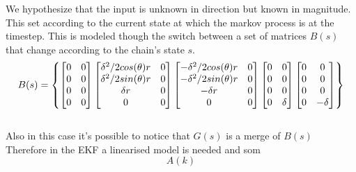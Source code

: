 \documentclass[twocolumn]{article}
\begin{document}
    We hypothesize that the input is unknown in direction but known in magnitude. This set according to the current state at which the markov process is at the timestep.
    This is modeled though the switch between a set of matrices $B(s)$ that change according to the chain's state $s$.
    \begin{equation*}%
        \resizebox{.99 \columnwidth}{!}{
        $B(s)=\begin{Bmatrix}
            \begin{bmatrix}
                0 & 0 \\
                0          & 0 \\
                0     & 0 \\
                0          & 0 \\
            \end{bmatrix}
            \begin{bmatrix}
                \delta^2/2 cos(\theta)r & 0 \\
                \delta^2/2 sin(\theta)r & 0 \\
                \delta r    & 0 \\
                0          & 0 \\
            \end{bmatrix}
            \begin{bmatrix}
                -\delta^2/2 cos(\theta)r & 0 \\
                -\delta^2/2 sin(\theta)r & 0 \\
                -\delta r    & 0 \\
                0          & 0 \\
            \end{bmatrix}
            \begin{bmatrix}
                0 & 0          \\
                0 & 0 \\
                0 & 0          \\
                0 & \delta     \\
            \end{bmatrix}
            \begin{bmatrix}
                0 & 0          \\
                0 & 0 \\
                0 & 0          \\
                0 & -\delta     \\
            \end{bmatrix}
        \end{Bmatrix} $ 
        }
    \end{equation*}
    \\
    Also in this case it's possible to notice that $G(s)$ is a merge of $B(s)$
    Therefore in the EKF a linearised model is needed
    and som
    \begin{equation*}
        A(k)
    \end{equation*} 
\end{document}
